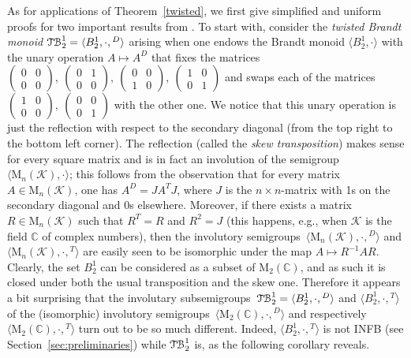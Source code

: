 \documentclass[11pt,reqno]{amsart}
\newcommand{\sgp}{semi\-group}
\newcommand{\sgps}{semi\-groups}
\newcommand{\iss}{involutory semi\-groups}
\newcommand{\TB}{\ensuremath{\mathcal{T\kern-.5pt B}_2^1}}
\begin{document}
As for applications of Theorem~\ref{twisted}, we first give simplified and uniform proofs for two important results from \cite{ADV:2012}.
To start with, consider the \emph{twisted Brandt monoid} $\TB=\langle B_2^1,\cdot,{}^D\rangle$ arising when one endows the Brandt monoid
$\langle B_2^1,\cdot\rangle$ with the unary operation $A\mapsto A^D$ that fixes the matrices $\left(\begin{smallmatrix} 0 & 0\\ 0 &
0\end{smallmatrix}\right),\ \left(\begin{smallmatrix} 0 & 1\\ 0 & 0\end{smallmatrix}\right),\ \left(\begin{smallmatrix} 0 & 0\\ 1 &
0\end{smallmatrix}\right),\ \left(\begin{smallmatrix} 1 & 0\\ 0 & 1\end{smallmatrix}\right)$ and swaps each of the matrices
$\left(\begin{smallmatrix}1 & 0\\ 0 & 0\end{smallmatrix}\right),\ \left(\begin{smallmatrix} 0 & 0\\ 0 & 1\end{smallmatrix}\right)$ with the
other one. We notice that this unary operation is just the reflection with respect to the secondary diagonal (from the top right to the
bottom left corner). The reflection (called the \emph{skew transposition}) makes sense for every square matrix and is in fact an involution
of the \sgp\ $\langle\mathrm{M}_n(\mathcal{K}),\cdot\rangle$; this follows from the observation that for every matrix
$A\in\mathrm{M}_n(\mathcal{K})$, one has $A^D=JA^TJ$, where $J$ is the $n\times n$-matrix with 1s on the secondary diagonal and 0s
elsewhere. Moreover, if there exists a matrix $R\in\mathrm{M}_n(\mathcal{K})$ such that $R^T=R$ and $R^2=J$ (this happens, e.g., when
$\mathcal{K}$ is the field $\mathbb{C}$ of complex numbers), then the \iss\ $\langle\mathrm{M}_n(\mathcal{K}),\cdot,{}^D\rangle$ and
$\langle\mathrm{M}_n(\mathcal{K}),\cdot,{}^T\rangle$ are easily seen to be isomorphic under the map $A\mapsto R^{-1}AR$. Clearly, the set
$B_2^1$ can be considered as a subset of $\mathrm{M}_2(\mathbb{C})$, and as such it is closed under both the usual transposition and the
skew one. Therefore it appears a bit surprising that the involutary sub\sgps\ $\TB=\langle B_2^1,\cdot,{}^D\rangle$ and $\langle
B_2^1,\cdot,{}^T\rangle$ of the (isomorphic) \iss\ $\langle\mathrm{M}_2(\mathbb{C}),\cdot,{}^D\rangle$ and respectively
$\langle\mathrm{M}_2(\mathbb{C}),\cdot,{}^T\rangle$ turn out to be so much different. Indeed, $\langle B_2^1,\cdot,{}^T\rangle$ is not INFB
(see Section~\ref{sec:preliminaries}) while $\TB$ is, as the following corollary reveals.
\end{document}
